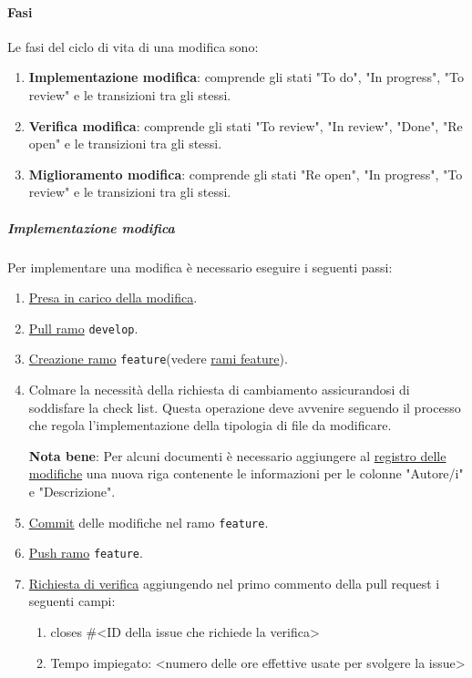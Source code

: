 \paragraph{Fasi}
Le fasi del ciclo di vita di una modifica sono:
\begin{enumerate}
    \item \textbf{Implementazione modifica}: comprende gli stati "To do", "In progress", "To review" e le transizioni tra gli stessi.

    \item \textbf{Verifica modifica}: comprende gli stati "To review", "In review", "Done", "Re open" e le transizioni tra gli stessi.
    
  
    \item \textbf{Miglioramento modifica}: comprende gli stati "Re open", "In progress", "To review" e le transizioni tra gli stessi. 
  
\end{enumerate}

\subparagraph{Implementazione modifica}
Per implementare una modifica è necessario eseguire i seguenti passi:
\begin{enumerate}
\item \hyperref[subpar:presa_carico_modifica]{Presa in carico della modifica}.

\item \hyperref[subpar:pull]{Pull ramo} \texttt{develop}.

\item \hyperref[subpar:branch]{Creazione ramo} \texttt{feature}(vedere \hyperref[item:rami_feature]{rami feature}).

\item Colmare la necessità della richiesta di cambiamento assicurandosi di soddisfare la check list.
Questa operazione deve avvenire seguendo il processo che regola l'implementazione della tipologia di file da modificare.

\textbf{Nota bene}: Per alcuni documenti è necessario aggiungere al \hyperref[par:registro_delle_modifiche]{registro delle modifiche} una nuova riga contenente le informazioni per le colonne "Autore/i" e "Descrizione". 

\item \hyperref[subpar:commit]{Commit} delle modifiche nel ramo \texttt{feature}.

\item \hyperref[subpar:push]{Push ramo} \texttt{feature}.

\item \hyperref[subpar:github_richiesta_di_verifica]{Richiesta di verifica} aggiungendo nel primo commento della
 pull request i seguenti campi:
 \begin{enumerate}
    \item closes \#\textless ID della issue che richiede la verifica\textgreater
    \item Tempo impiegato: \textless numero delle ore effettive usate per svolgere la issue\textgreater
 \end{enumerate}

\end{enumerate}

